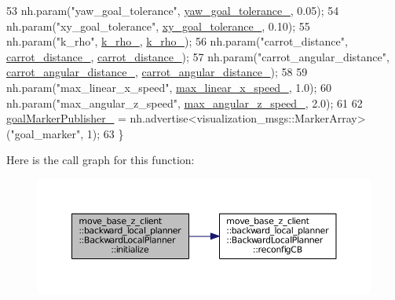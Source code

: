 \begin{DoxyCode}
53     nh.param(\textcolor{stringliteral}{"yaw\_goal\_tolerance"}, \hyperlink{classmove__base__z__client_1_1backward__local__planner_1_1BackwardLocalPlanner_a10d15842054d518159baa535afe6f1fd}{yaw\_goal\_tolerance\_}, 0.05);
54     nh.param(\textcolor{stringliteral}{"xy\_goal\_tolerance"}, \hyperlink{classmove__base__z__client_1_1backward__local__planner_1_1BackwardLocalPlanner_a89ab1ee7283a474dc19970789f51c087}{xy\_goal\_tolerance\_}, 0.10);
55     nh.param(\textcolor{stringliteral}{"k\_rho"}, \hyperlink{classmove__base__z__client_1_1backward__local__planner_1_1BackwardLocalPlanner_a9ae9a8c4c4663a999ba107aea9f6868d}{k\_rho\_}, \hyperlink{classmove__base__z__client_1_1backward__local__planner_1_1BackwardLocalPlanner_a9ae9a8c4c4663a999ba107aea9f6868d}{k\_rho\_});
56     nh.param(\textcolor{stringliteral}{"carrot\_distance"}, \hyperlink{classmove__base__z__client_1_1backward__local__planner_1_1BackwardLocalPlanner_a6dc3aa0ff63f9f7d0aae852755734b5d}{carrot\_distance\_}, 
      \hyperlink{classmove__base__z__client_1_1backward__local__planner_1_1BackwardLocalPlanner_a6dc3aa0ff63f9f7d0aae852755734b5d}{carrot\_distance\_});
57     nh.param(\textcolor{stringliteral}{"carrot\_angular\_distance"}, \hyperlink{classmove__base__z__client_1_1backward__local__planner_1_1BackwardLocalPlanner_a3d6cba0748b85a67f5dfd7740de9530f}{carrot\_angular\_distance\_}, 
      \hyperlink{classmove__base__z__client_1_1backward__local__planner_1_1BackwardLocalPlanner_a3d6cba0748b85a67f5dfd7740de9530f}{carrot\_angular\_distance\_});
58 
59     nh.param(\textcolor{stringliteral}{"max\_linear\_x\_speed"}, \hyperlink{classmove__base__z__client_1_1backward__local__planner_1_1BackwardLocalPlanner_a287325b11b5eb8a76b6924b42f859e25}{max\_linear\_x\_speed\_}, 1.0);
60     nh.param(\textcolor{stringliteral}{"max\_angular\_z\_speed"}, \hyperlink{classmove__base__z__client_1_1backward__local__planner_1_1BackwardLocalPlanner_a8b5cbc273dfcf1c5e15ac4475b45ca97}{max\_angular\_z\_speed\_}, 2.0);
61 
62     \hyperlink{classmove__base__z__client_1_1backward__local__planner_1_1BackwardLocalPlanner_a7228d3fe90bc48b486e5c46d6ac5e815}{goalMarkerPublisher\_} = nh.advertise<visualization\_msgs::MarkerArray>(\textcolor{stringliteral}{"goal\_marker"},
       1);
63 \}
\end{DoxyCode}


Here is the call graph for this function\+:
\nopagebreak
\begin{figure}[H]
\begin{center}
\leavevmode
\includegraphics[width=350pt]{classmove__base__z__client_1_1backward__local__planner_1_1BackwardLocalPlanner_acdb083587fd77dc2c8d617751ac08f74_cgraph}
\end{center}
\end{figure}




